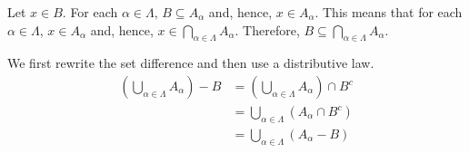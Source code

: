 \begin{list}{\bf{\ref{exer:indexsubsets}.}}
\item \begin{list}{\bf{(a)}}
\item Let $x \in B$.  For each $\alpha \in \Lambda$, $B \subseteq A_\alpha$ and, hence, 
$x \in A_\alpha$.  This means that for each 
$\alpha \in \Lambda$, $x \in A_\alpha$  and, hence, 
$x \in \bigcap\limits_{\alpha \in \Lambda}^{}A_\alpha$.  Therefore, 
$B \subseteq \bigcap\limits_{\alpha \in \Lambda}^{}A_\alpha$.
\end{list}
\end{list}


\begin{list}{\bf{\ref{exer:gendemorgan}.}}
\item \begin{list}{\bf{(a)}}
\item We first rewrite the set difference and then use a distributive law.
\begin{align*}
\left(\bigcup\limits_{\alpha \in \Lambda}^{}A_{\alpha} \right) - B 
            &= \left(\bigcup\limits_{\alpha \in \Lambda}^{}A_{\alpha} \right) \cap B^c \\
            &= \bigcup\limits_{\alpha \in \Lambda}^{}\left( A_\alpha \cap B^c \right) \\
            &=\bigcup\limits_{\alpha \in \Lambda}^{} \left( A_{\alpha} - B \right) \\
\end{align*}
\end{list}
\end{list}
\hbreak
\endinput

